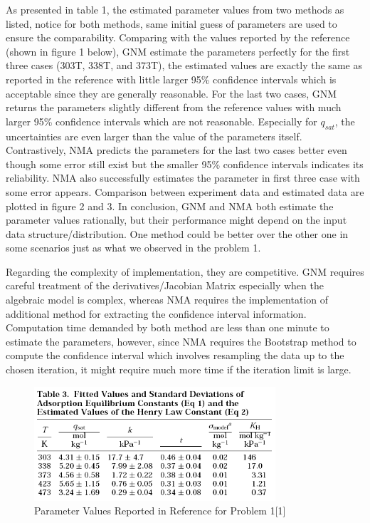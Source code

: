 \documentclass[12pt]{article} %
\begin{document}
As presented in table 1, the estimated parameter values from two methods as listed, notice for both methods, same initial guess of parameters are used to ensure the comparability. Comparing with the values reported by the reference (shown in figure 1 below), GNM estimate the parameters perfectly for the first three cases (303T, 338T, and 373T), the estimated values are
exactly the same as reported in the reference with little larger 95\% confidence intervals which is acceptable since they are generally reasonable. For the last two cases, GNM returns the parameters slightly different from 
the reference values with much larger 95\% confidence intervals which are not reasonable. Especially for $q_{sat}$, the uncertainties are even larger than the value of the parameters itself. Contrastively, NMA predicts the parameters for
the last two cases better even though some error still exist but the smaller 95\% confidence intervals indicates its reliability. NMA also successfully estimates the parameter in first three case with some error appears. Comparison between experiment data and estimated data are plotted in
figure 2 and 3. In conclusion, GNM and NMA both estimate the parameter values rationally, but their performance might depend on the input data structure/distribution. One method could be better over the other one in some scenarios just as what we observed in the problem 1. 

Regarding the complexity of
implementation, they are competitive. GNM requires careful treatment of the derivatives/Jacobian Matrix especially when the algebraic model is complex, whereas NMA requires the implementation of additional method for extracting the confidence interval information. Computation time demanded by both
method are less than one minute to estimate the parameters, however, since NMA requires the Bootstrap method to compute the confidence interval which involves resampling the data up to the chosen iteration, it might require much more time if the iteration limit is large.
\begin{figure}[ht]
    \centering
    \includegraphics[width=0.8\textwidth]{Q1_ref.png}
    \caption{Parameter Values Reported in Reference for Problem 1[1]}
\end{figure}
\end{document}

